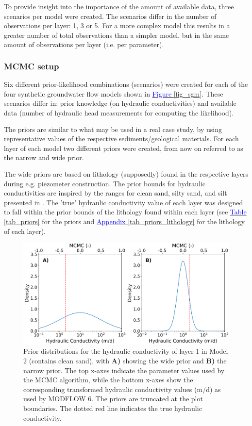 To provide insight into the importance of the amount of available data, three scenarios per model were created. The scenarios differ in the number of observations per layer: 1, 3 or 5. For a more complex model this results in a greater number of total observations than a simpler model, but in the same amount of observations per layer (i.e. per parameter). 

\subsubsection{MCMC setup}\label{mcmc setup}
Six different prior-likelihood combinations (scenarios) were created for each of the four synthetic groundwater flow models shown in \hyperref[fig_sgm]{\textcolor{blue}{Figure }\ref{fig_sgm}}. These scenarios differ in: prior knowledge (on hydraulic conductivities) and available data (number of hydraulic head measurements for computing the likelihood). 

The priors are similar to what may be used in a real case study, by using representative values of the respective sediments/geological materials. For each layer of each model two different priors were created, from now on referred to as the narrow and wide prior. 

The wide priors are based on lithology (supposedly) found in the respective layers during e.g. piezometer construction. The prior bounds for hydraulic conductivities are inspired by the ranges for clean sand, silty sand, and silt presented in \cite{woessner2020hydrogeologic}. The 'true' hydraulic conductivity value of each layer was designed to fall within the prior bounds of the lithology found within each layer (see \hyperref[tab_priors]{\textcolor{blue}{Table }\ref{tab_priors}} for the priors and \hyperref[tab_priors_lithology]{\textcolor{blue}{Appendix }\ref{tab_priors_lithology}} for the lithology of each layer). 

\begin{figure}[htb]
\centering
\includegraphics[width=1.0\linewidth]{Figures/priors.png}
\caption{Prior distributions for the hydraulic conductivity of layer 1 in Model 2 (contains clean sand), with \textbf{A)} showing the wide prior and \textbf{B)} the narrow prior. The top x-axes indicate the parameter values used by the MCMC algorithm, while the bottom x-axes show the corresponding transformed hydraulic conductivity values (m/d) as used by MODFLOW 6. The priors are truncated at the plot boundaries. The dotted red line indicates the true hydraulic conductivity.}\label{fig_priors}
\end{figure} 

